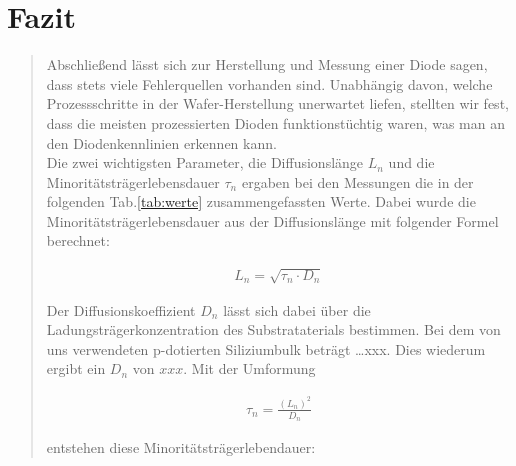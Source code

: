 \begin{quote}
\begin{quote}
        \end{quote}

\end{quote} %


\newpage

\section{Fazit}
\begin{quote}

    Abschließend lässt sich zur Herstellung und Messung einer Diode sagen, dass
    stets viele Fehlerquellen vorhanden sind. Unabhängig davon, welche
    Prozessschritte in der Wafer-Herstellung unerwartet liefen, stellten wir
    fest, dass die meisten prozessierten Dioden funktionstüchtig waren, was man
    an den Diodenkennlinien erkennen kann.\\
    
    Die zwei wichtigsten Parameter, die Diffusionslänge $L_n$ und die
    Minoritätsträgerlebensdauer $\tau_n$ ergaben bei den Messungen die
    in der folgenden Tab.\ref{tab:werte} zusammengefassten Werte. Dabei
    wurde die Minoritätsträgerlebensdauer aus der Diffusionslänge mit folgender Formel berechnet:
    
    \begin{equation*}
        \begin{split}
            L_{n} = \sqrt{\tau_{n} \cdot D_{n}}
        \end{split}
    \end{equation*}
    
    Der Diffusionskoeffizient $D_n$ lässt sich dabei über die
    Ladungsträgerkonzentration des Substrataterials bestimmen. Bei dem von uns
    verwendeten p-dotierten Siliziumbulk beträgt \ldots xxx. Dies wiederum
    ergibt ein $D_n$ von $xxx$. Mit der Umformung
    
    \begin{equation*}
        \begin{split}
            \tau_n = \frac{(L_n)^2}{D_n}
        \end{split}
    \end{equation*}
    
    entstehen diese Minoritätsträgerlebendauer:
    
    \vspace{1.5em}
    

\end{quote}
